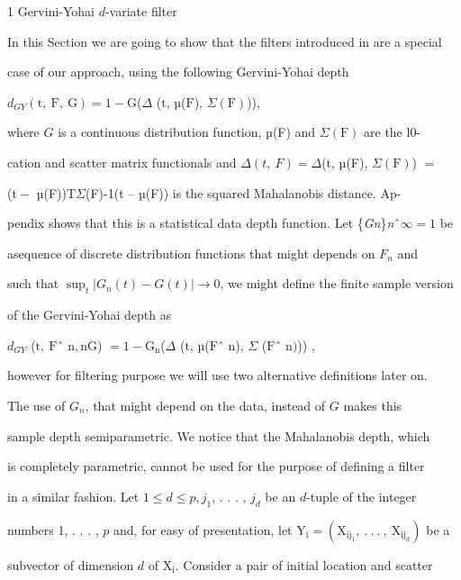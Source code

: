 \documentclass[a4paper,12pt]{article}
\begin{document}
1 Gervini-Yohai $d$-variate filter

In this Section we are going to show that the filters introduced in are a special

case of our approach, using the following Gervini-Yohai depth
\begin{center}
$d_{GY}(\mathrm{t},\ \mathrm{F},\ \mathrm{G})=1-\mathrm{G}$($\Delta$ ($\mathrm{t}$, µ($\mathrm{F}$), $\Sigma(\mathrm{F})$)),
\end{center}
where $G$ is a continuous distribution function, µ(F) and $\Sigma(\mathrm{F})$ are the l0-

cation and scatter matrix functionals and $\Delta(t,\ F) = \Delta$($\mathrm{t}$, µ(F), $\Sigma(\mathrm{F})$) $=$

($\mathrm{t} -$ µ(F))T$\Sigma$(F)-1(t -- µ(F)) is the squared Mahalanobis distance. Ap-

pendix shows that this is a statistical data depth function. Let \{{\it Gn}\}{\it n}ˆ$\infty=1$ be

asequence of discrete distribution functions that might depends on $F_{n}$ and

such that $\displaystyle \sup_{t}|G_{n}(t)-G(t)|\rightarrow 0$, we might define the finite sample version

of the Gervini-Yohai depth as
\begin{center}
$d_{GY}$ ($\mathrm{t},\ \mathrm{F}$ˆ $\mathrm{n},\mathrm{n}\mathrm{G}$) $=1-\mathrm{G}_{\mathrm{n}}$($\Delta$ ($\mathrm{t}$, µ($\mathrm{F}$ˆ $\mathrm{n}$), $\Sigma$ ($\mathrm{F}$ˆ $\mathrm{n})$)) ,
\end{center}
however for filtering purpose we will use two alternative definitions later on.

The use of $G_{n}$, that might depend on the data, instead of $G$ makes this

sample depth semiparametric. We notice that the Mahalanobis depth, which

is completely parametric, cannot be used for the purpose of defining a filter

in a similar fashion. Let $1 \leq d \leq p, j_{1}$, . . . , $j_{d}$ be an $d$-tuple of the integer

numbers 1, . . . , $p$ and, for easy of presentation, let $\mathrm{Y}_{\mathrm{i}}= (\mathrm{X}_{\mathrm{i}\mathrm{j}_{1}},\ .\ .\ .\ ,\ \mathrm{X}_{\mathrm{i}\mathrm{j}_{\mathrm{d}}})$ be a

subvector of dimension $d$ of $\mathrm{X}_{\mathrm{i}}$. Consider a pair of initial location and scatter
\end{document}

